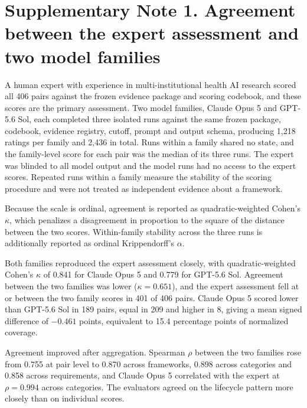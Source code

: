 \documentclass[10pt,a4paper]{article}
\begin{document}
\section{Supplementary Note 1. Agreement between the expert assessment and two model families}

A human expert with experience in multi-institutional health AI research scored all
406 pairs against the frozen evidence package and scoring codebook, and these scores
are the primary assessment. Two model families, Claude Opus 5 and GPT-5.6 Sol, each
completed three isolated runs against the same frozen package, codebook, evidence
registry, cutoff, prompt and output schema, producing 1,218 ratings per family and
2,436 in total. Runs within a family shared no state, and the family-level score for
each pair was the median of its three runs. The expert was blinded to all model
output and the model runs had no access to the expert scores. Repeated runs within a
family measure the stability of the scoring procedure and were not treated as
independent evidence about a framework.

Because the scale is ordinal, agreement is reported as quadratic-weighted Cohen's
$\kappa$, which penalizes a disagreement in proportion to the square of the distance
between the two scores.\cite{cohen1968,fleiss1973} Within-family stability across the
three runs is additionally reported as ordinal Krippendorff's
$\alpha$.\cite{hayes2007}

Both families reproduced the expert assessment closely, with quadratic-weighted
Cohen's $\kappa$ of 0.841 for Claude Opus 5 and 0.779 for GPT-5.6 Sol. Agreement
between the two families was lower ($\kappa = 0.651$), and the expert assessment fell
at or between the two family scores in 401 of 406 pairs. Claude Opus 5 scored lower
than GPT-5.6 Sol in 189 pairs, equal in 209 and higher in 8, giving a mean signed
difference of $-0.461$ points, equivalent to 15.4 percentage points of normalized
coverage.

Agreement improved after aggregation. Spearman $\rho$ between the two families rose
from 0.755 at pair level to 0.870 across frameworks, 0.898 across categories and
0.858 across requirements, and Claude Opus 5 correlated with the expert at
$\rho = 0.994$ across categories. The evaluators agreed on the lifecycle pattern more
closely than on individual scores.
\end{document}
